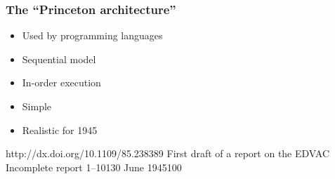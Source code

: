 \documentclass[dvipsnames,presentation,aspectratio=169,14pt]{beamer}
\begin{document}
\begin{frame}
  \frametitle{The ``Princeton architecture''}
  \begin{itemize}
  \item Used by programming languages
  \item Sequential model
  \item In-order execution
  \item Simple
  \item<2> Realistic
    for 1945
  \end{itemize}
  \vfill
  \pause

  \begin{thebibliography}{99}
   
    {http://dx.doi.org/10.1109/85.238389}
    {First draft of a report on the EDVAC}
    {Incomplete report}
    {1--101}{30 June 1945}{100}
  \end{thebibliography}
\end{frame}

\end{document}
